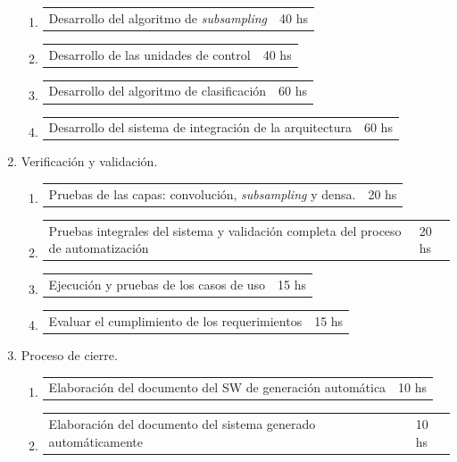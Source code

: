 \documentclass[11pt]{charter}
\begin{document}
\begin{enumerate}
\begin{enumerate}
	\item \begin{tabular}[]{p{11cm} p{2cm}} Desarrollo del algoritmo de \textit{subsampling} 								& 40 hs \end{tabular}
	\item \begin{tabular}[]{p{11cm} p{2cm}} Desarrollo de las unidades de control    												& 40 hs \end{tabular}
	\item \begin{tabular}[]{p{11cm} p{2cm}} Desarrollo del algoritmo de clasificación   										& 60 hs \end{tabular}
	\item \begin{tabular}[]{p{11cm} p{2cm}} Desarrollo del sistema de integración de la arquitectura    		& 60 hs \end{tabular}
	\end{enumerate}
\item Verificación y validación.
	\begin{enumerate}
	\item \begin{tabular}[]{p{11cm} p{2cm}} Pruebas de las capas: convolución, \textit{subsampling} y densa.											& 20 hs \end{tabular}
	\item \begin{tabular}[]{p{11cm} p{2cm}} Pruebas integrales del sistema y validación completa del proceso de automatización 		& 20 hs \end{tabular}
	\item \begin{tabular}[]{p{11cm} p{2cm}} Ejecución y pruebas de los casos de uso 																							& 15 hs \end{tabular}
	\item \begin{tabular}[]{p{11cm} p{2cm}} Evaluar el cumplimiento de los requerimientos  																				& 15 hs \end{tabular}
	\end{enumerate}
\item Proceso de cierre.
	\begin{enumerate}
	\item \begin{tabular}[]{p{11cm} p{2cm}} Elaboración del documento del SW de generación automática 			& 10 hs \end{tabular}
	\item \begin{tabular}[]{p{11cm} p{2cm}} Elaboración del documento del sistema generado automáticamente 	& 10 hs \end{tabular}

\end{enumerate}
\end{enumerate}
\end{document}
